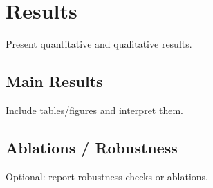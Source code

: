 \chapter{Results}

Present quantitative and qualitative results.

\section{Main Results}
Include tables/figures and interpret them.

\section{Ablations / Robustness}
Optional: report robustness checks or ablations.
